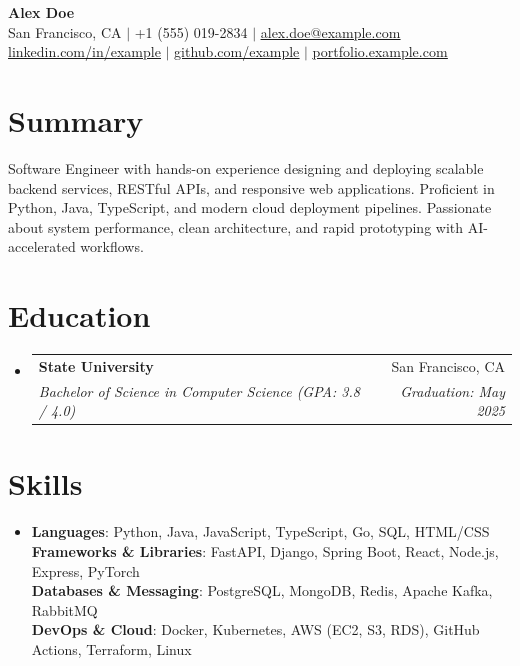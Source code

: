 \documentclass[letterpaper,10pt]{article}
\makeatletter
\newcommand{\resumeSubheading}[4]{
  \vspace{-1pt}\item
    \begin{tabular*}{0.97\textwidth}[t]{l@{\extracolsep{\fill}}r}
      \textbf{#1} & #2 \\
      \textit{#3} & \textit{#4} \\
    \end{tabular*}\vspace{-6pt}
}
\newcommand{\resumeSubHeadingListStart}{\begin{itemize}[leftmargin=0.15in, label={}]}
\newcommand{\resumeSubHeadingListEnd}{\end{itemize}}
\makeatother
\begin{document}
\begin{center}
    \textbf{\Huge Alex Doe} \\ \vspace{3pt}
    \small San Francisco, CA $|$ +1 (555) 019-2834 $|$ \href{mailto:alex.doe@example.com}{\underline{alex.doe@example.com}} \\ \vspace{1pt}
    \href{https://linkedin.com/in/example}{\underline{linkedin.com/in/example}} $|$ 
    \href{https://github.com/example}{\underline{github.com/example}} $|$ 
    \href{https://portfolio.example.com}{\underline{portfolio.example.com}}
\end{center}

\section{Summary}
Software Engineer with hands-on experience designing and deploying scalable backend services, RESTful APIs, and responsive web applications. Proficient in Python, Java, TypeScript, and modern cloud deployment pipelines. Passionate about system performance, clean architecture, and rapid prototyping with AI-accelerated workflows.

\section{Education}
  \resumeSubHeadingListStart
    \resumeSubheading
      {State University}{San Francisco, CA}
      {Bachelor of Science in Computer Science (GPA: 3.8 / 4.0)}{Graduation: May 2025}
  \resumeSubHeadingListEnd

\section{Skills}
 \begin{itemize}[leftmargin=0.15in, label={}]
    \item{
     \textbf{Languages}{: Python, Java, JavaScript, TypeScript, Go, SQL, HTML/CSS} \\
     \textbf{Frameworks \& Libraries}{: FastAPI, Django, Spring Boot, React, Node.js, Express, PyTorch} \\
     \textbf{Databases \& Messaging}{: PostgreSQL, MongoDB, Redis, Apache Kafka, RabbitMQ} \\
     \textbf{DevOps \& Cloud}{: Docker, Kubernetes, AWS (EC2, S3, RDS), GitHub Actions, Terraform, Linux}
    }
 \end{itemize}
\end{document}
